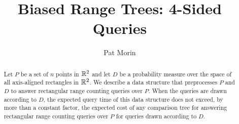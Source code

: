 \documentclass{patmorin}
\title{Biased Range Trees: 4-Sided Queries}
\author{Pat Morin}
\begin{document}
\maketitle

\begin{abstract}
Let $P$ be a set of $n$ points in $\mathbb{R}^2$ and let $D$ be a probability
measure over the space of all axis-aligned rectangles in $\mathbb{R}^2$.
We describe a data structure that preprocesses $P$ and $D$ to answer
rectangular range counting queries over $P$.  When the queries are drawn
according to $D$, the expected query time of this data structure does
not exceed, by more than a constant factor, the expected cost of any
comparison tree for answering rectangular range counting queries over $P$
for queries drawn according to $D$.
\end{abstract}
\end{document}
